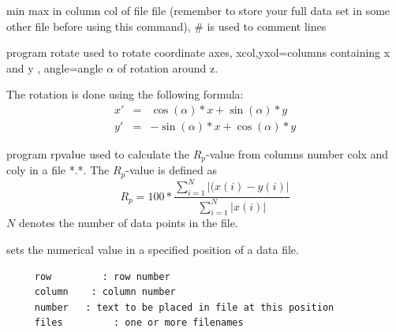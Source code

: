 \begin{description}
min max in column  col of
                       file file (remember to store your full data set in some other
		       file before using this command), \# is used to comment lines
\item[\prg rotate\index{rotate}\label{rotate} xcol ycol angle file:]
program rotate  used to rotate coordinate axes,
 xcol,yxol=columns containing x and y , 
 angle=angle $\alpha$ of rotation around z.
 
 The rotation is done using the following formula:
\begin{eqnarray}
 x'&= &\cos(\alpha)*x+\sin(\alpha)*y \nonumber \\
 y'&=&-\sin(\alpha)*x+\cos(\alpha)*y
\end{eqnarray}
\item [\prg rpvalue\index{rpvalue}\label{rpvalue} colx coly  *.*:]  program rpvalue  used to %
calculate 
                       the $R_p$-value from columns number colx and coly 
		       in a file *.*. The $R_p$-value is defined as
		       \begin{equation}
		       R_p= 100*\frac{\sum_{i=1}^{N} |(x(i)-y(i)|}{\sum_{i=1}^{N}|x(i)|}
		       \end{equation}
                       $N$ denotes the number of data points in the file.
\item [\prg setvalue\index{setvalue}\label{setvalue} row column text files:] sets the numerical value in a specified position of a data file.

\begin{verbatim}
     row         : row number
     column    : column number
     number   : text to be placed in file at this position
     files         : one or more filenames


\end{verbatim}
\end{description}

